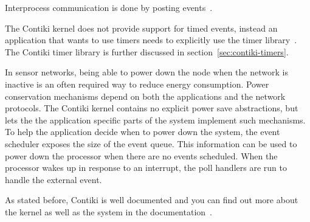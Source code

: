 Interprocess communication is done by posting events~\cite{paper-contiki}.

The Contiki kernel does not provide support for timed events,
instead an application that wants to use timers needs to explicitly use the timer library~\cite{contiki-docs}.
The Contiki timer library is further discussed in section~\ref{sec:contiki-timers}.

In sensor networks, being able to power down the node
when the network is inactive is an often required way to reduce energy consumption.
Power conservation mechanisms
depend on both the applications and the network protocols.
The Contiki kernel contains no explicit power
save abstractions, but lets the the application specific parts
of the system implement such mechanisms.
To help the application decide when to power down the system, the event
scheduler exposes the size of the event queue.
This information can be used to power down the processor when there
are no events scheduled. When the processor wakes up in
response to an interrupt, the poll handlers are run to handle the external event.

As stated before, Contiki is well documented and you can find out more about
the kernel as well as the system in the documentation~\cite{contiki-docs}.
